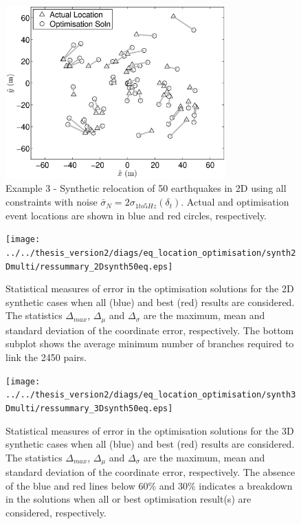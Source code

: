 \documentclass[draft,jgrga]{agutex}
\begin{document}
\begin{figure}
\noindent\includegraphics[width = 20pc]{diags/locs_2D_50eq_3.eps}
\caption{Example 3 - Synthetic relocation of 50 earthquakes in 2D using all constraints with noise
$\bar{\sigma}_N= 2 \sigma_{1to5Hz}(\delta_t)$.
 Actual and optimisation event locations
are shown in blue and red circles, respectively.}
\label{fig-2D50eq-relocation_eg3}
\end{figure}

\begin{figure}
\noindent\texttt{[image: ../../thesis\_version2/diags/eq\_location\_optimisation/synth2Dmulti/ressummary\_2Dsynth50eq.eps]}
\caption{Statistical measures of error in the optimisation solutions for the 2D synthetic cases when all (blue)
and best (red) results are considered. The statistics $\Delta_{max}$, $\Delta_\mu$ and
$\Delta_\sigma$ are the maximum, mean and standard deviation of the coordinate error, respectively.
The bottom subplot shows the average minimum number of branches required to link the 2450 pairs.}
 \label{fig:optimisationresults-2Dsynth}
\end{figure}

\begin{figure}
\noindent\texttt{[image: ../../thesis\_version2/diags/eq\_location\_optimisation/synth3Dmulti/ressummary\_3Dsynth50eq.eps]}
\caption{Statistical measures of error in the optimisation solutions for the 3D synthetic cases when all (blue)
and best (red) results are considered. The statistics $\Delta_{max}$, $\Delta_\mu$ and
$\Delta_\sigma$ are the maximum, mean and standard deviation of the coordinate error, respectively.
The absence of the blue and red lines below 60\% and 30\% indicates a breakdown in the solutions
when all or best optimisation result(s) are considered, respectively.}
\label{fig:optimisationresults-3Dsynth}
\end{figure}
\end{document}
